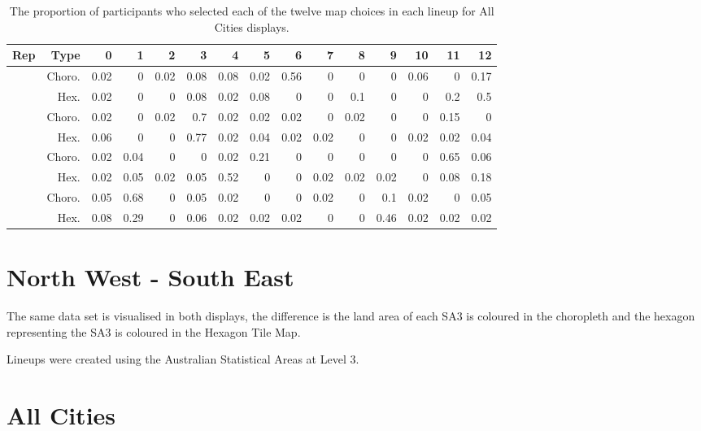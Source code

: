 \documentclass{monashthesis}
\begin{document}
\begin{table}

\caption{\label{tab:choice-all}The proportion of participants who selected each of the twelve map choices in each lineup for All Cities displays.}
\centering
\begin{tabular}[t]{r|r|r|r|r|r|r|r|r|r|r|r|r|r|r}
\hline
Rep & Type & 0 & 1 & 2 & 3 & 4 & 5 & 6 & 7 & 8 & 9 & 10 & 11 & 12\\
\hline
 & Choro. & 0.02 & 0 & 0.02 & 0.08 & 0.08 & 0.02 & 0.56 & 0 & 0 & 0 & 0.06 & 0 & 0.17\\
\cline{2-15}
\multirow{-2}{*}{\raggedleft\arraybackslash 1} & Hex. & 0.02 & 0 & 0 & 0.08 & 0.02 & 0.08 & 0 & 0 & 0.1 & 0 & 0 & 0.2 & 0.5\\
\cline{1-15}
 & Choro. & 0.02 & 0 & 0.02 & 0.7 & 0.02 & 0.02 & 0.02 & 0 & 0.02 & 0 & 0 & 0.15 & 0\\
\cline{2-15}
\multirow{-2}{*}{\raggedleft\arraybackslash 2} & Hex. & 0.06 & 0 & 0 & 0.77 & 0.02 & 0.04 & 0.02 & 0.02 & 0 & 0 & 0.02 & 0.02 & 0.04\\
\cline{1-15}
 & Choro. & 0.02 & 0.04 & 0 & 0 & 0.02 & 0.21 & 0 & 0 & 0 & 0 & 0 & 0.65 & 0.06\\
\cline{2-15}
\multirow{-2}{*}{\raggedleft\arraybackslash 3} & Hex. & 0.02 & 0.05 & 0.02 & 0.05 & 0.52 & 0 & 0 & 0.02 & 0.02 & 0.02 & 0 & 0.08 & 0.18\\
\cline{1-15}
 & Choro. & 0.05 & 0.68 & 0 & 0.05 & 0.02 & 0 & 0 & 0.02 & 0 & 0.1 & 0.02 & 0 & 0.05\\
\cline{2-15}
\multirow{-2}{*}{\raggedleft\arraybackslash 4} & Hex. & 0.08 & 0.29 & 0 & 0.06 & 0.02 & 0.02 & 0.02 & 0 & 0 & 0.46 & 0.02 & 0.02 & 0.02\\
\hline
\end{tabular}
\end{table}

\hypertarget{north-west---south-east}{%
\section{North West - South East}\label{north-west---south-east}}

The same data set is visualised in both displays, the difference is the land area of each SA3 is coloured in the choropleth and the hexagon representing the SA3 is coloured in the Hexagon Tile Map.

Lineups were created using the Australian Statistical Areas at Level 3.

\hypertarget{all-cities}{%
\section{All Cities}\label{all-cities}}
\end{document}
